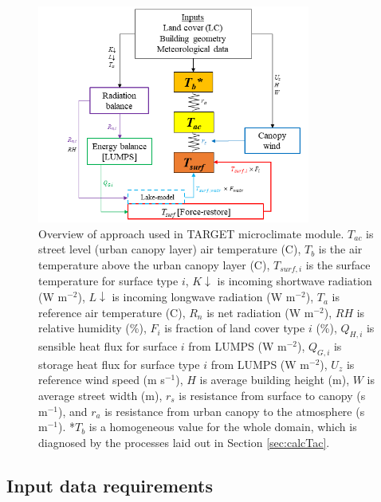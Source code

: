 \documentclass[gmd, manuscript]{copernicus}
\begin{document}
\begin{figure}[!htbp]
\begin{center}

\includegraphics[width=0.8\textwidth,keepaspectratio]{figure1.png}

\caption{Overview of approach used in TARGET microclimate module. $T_{ac}$ is street level (urban canopy layer) air temperature (\degree C), \ensuremath{T_{b}} is the air temperature above the urban canopy layer (\degree C), $T_{surf,i}$ is the surface temperature for surface type $i$, \ensuremath{K\downarrow} is incoming shortwave radiation (W m$^{-2}$), \ensuremath{L\downarrow} is incoming longwave radiation (W m$^{-2}$), \ensuremath{T_{a}} is reference air temperature (\degree C), \ensuremath{R_{n}} is net radiation (W m$^{-2}$), \ensuremath{RH} is relative humidity (\%), $F_{i}$ is fraction of land cover type $i$ (\%), \ensuremath{Q_{H,i}} is sensible heat flux for surface $i$ from LUMPS (W m$^{-2}$), \ensuremath{Q_{G,i}} is storage heat flux for surface type $i$ from LUMPS (W m$^{-2}$), \ensuremath{U_{z}} is reference wind speed (m s$^{-1}$), $H$ is average building height (m), $W$ is average street width (m), \ensuremath{r_{s}} is resistance from surface to canopy (s m$^{-1}$), and \ensuremath{r_{a}} is resistance from urban canopy to the atmosphere (s m$^{-1}$). *\ensuremath{T_{b}} is a homogeneous value for the whole domain, which is diagnosed by the processes laid out in Section \ref{sec:calcTac}.} \label{fig:overview}
 \end{center}

\end{figure}


\subsection{Input data requirements}\label{sec:datainputs}
\end{document}
